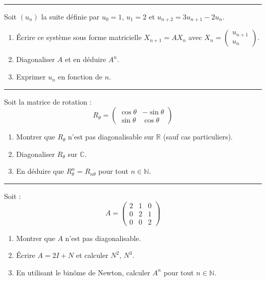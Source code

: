 \documentclass[../PolyS4.tex]{subfiles}
\begin{document}
\vspace{1em}
\hrule
\vspace{1em}


Soit $(u_n)$ la suite définie par $u_0 = 1$, $u_1 = 2$ et $u_{n+2} = 3u_{n+1} - 2u_n$.
\begin{enumerate}
    \item Écrire ce système sous forme matricielle $X_{n+1} = AX_n$ avec $X_n = \begin{pmatrix} u_{n+1} \\ u_n \end{pmatrix}$.
    \item Diagonaliser $A$ et en déduire $A^n$.
    \item Exprimer $u_n$ en fonction de $n$.
\end{enumerate}

\vspace{1em}
\hrule
\vspace{1em}


Soit la matrice de rotation :
$$R_\theta = \begin{pmatrix}
\cos\theta & -\sin\theta \\
\sin\theta & \cos\theta
\end{pmatrix}$$
\begin{enumerate}
    \item Montrer que $R_\theta$ n'est pas diagonalisable sur $\mathbb{R}$ (sauf cas particuliers).
    \item Diagonaliser $R_\theta$ sur $\mathbb{C}$.
    \item En déduire que $R_\theta^n = R_{n\theta}$ pour tout $n \in \mathbb{N}$.
\end{enumerate}

\vspace{1em}
\hrule
\vspace{1em}


Soit :
$$A = \begin{pmatrix}
2 & 1 & 0 \\
0 & 2 & 1 \\
0 & 0 & 2
\end{pmatrix}$$
\begin{enumerate}
    \item Montrer que $A$ n'est pas diagonalisable.
    \item Écrire $A = 2I + N$ et calculer $N^2$, $N^3$.
    \item En utilisant le binôme de Newton, calculer $A^n$ pour tout $n \in \mathbb{N}$.
\end{enumerate}
\end{document}
